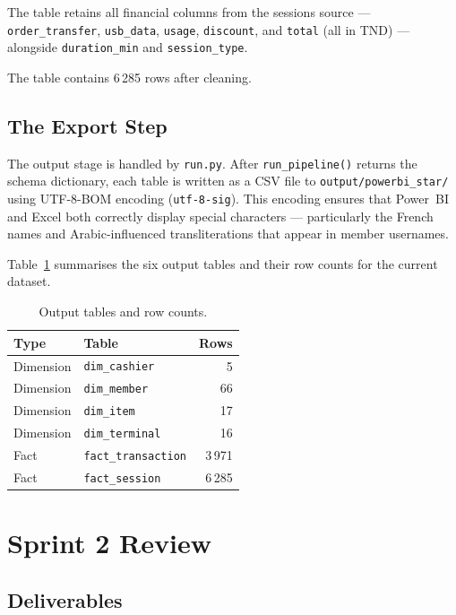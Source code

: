The table retains all financial columns from the sessions source — \texttt{order\_transfer},
\texttt{usb\_data}, \texttt{usage}, \texttt{discount}, and \texttt{total} (all in TND)
— alongside \texttt{duration\_min} and \texttt{session\_type}.

The table contains 6\,285 rows after cleaning.

\subsection{The Export Step}

The output stage is handled by \texttt{run.py}. After \texttt{run\_pipeline()} returns
the schema dictionary, each table is written as a CSV file to
\texttt{output/powerbi\_star/} using UTF-8-BOM encoding (\texttt{utf-8-sig}). This
encoding ensures that Power~BI and Excel both correctly display special characters —
particularly the French names and Arabic-influenced transliterations that appear in
member usernames.

Table~\ref{tab:output_tables} summarises the six output tables and their row counts
for the current dataset.

\begin{table}[H]
  \centering
  \caption{Output tables and row counts.\label{tab:output_tables}}
  \begin{tabular}{llr}
    \toprule
    \textbf{Type} & \textbf{Table} & \textbf{Rows} \\
    \midrule
    Dimension & \texttt{dim\_cashier}    &   5 \\
    Dimension & \texttt{dim\_member}     &  66 \\
    Dimension & \texttt{dim\_item}       &  17 \\
    Dimension & \texttt{dim\_terminal}   &  16 \\
    Fact      & \texttt{fact\_transaction} & 3\,971 \\
    Fact      & \texttt{fact\_session}   & 6\,285 \\
    \bottomrule
  \end{tabular}
\end{table}

\section{Sprint 2 Review}

\subsection{Deliverables}

